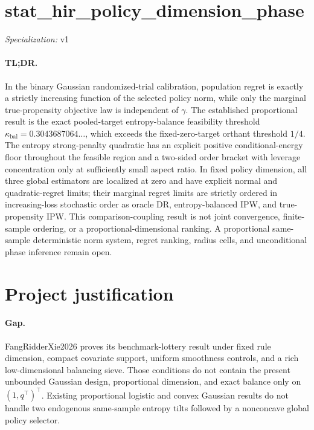 \documentclass{article}
\begin{document}
\sloppy

\section*{stat\_\allowbreak{}hir\_\allowbreak{}policy\_\allowbreak{}dimension\_\allowbreak{}phase}

\noindent\textit{Specialization:} v1\par

\paragraph{TL;DR.} In the binary Gaussian randomized-trial calibration, population regret is exactly a strictly increasing function of the selected policy norm, while only the marginal true-propensity objective law is independent of \(\gamma\). The established proportional result is the exact pooled-target entropy-balance feasibility threshold \(\kappa_{\mathrm{bal}}=0.3043687064\ldots\), which exceeds the fixed-zero-target orthant threshold \(1/4\). The entropy strong-penalty quadratic has an explicit positive conditional-energy floor throughout the feasible region and a two-sided order bracket with leverage concentration only at sufficiently small aspect ratio. In fixed policy dimension, all three global estimators are localized at zero and have explicit normal and quadratic-regret limits; their marginal regret limits are strictly ordered in increasing-loss stochastic order as oracle DR, entropy-balanced IPW, and true-propensity IPW. This comparison-coupling result is not joint convergence, finite-sample ordering, or a proportional-dimensional ranking. A proportional same-sample deterministic norm system, regret ranking, radius cells, and unconditional phase inference remain open.

\section{Project justification}

\paragraph{Gap.} FangRidderXie2026 proves its benchmark-lottery result under fixed rule dimension, compact covariate support, uniform smoothness controls, and a rich low-dimensional balancing sieve. Those conditions do not contain the present unbounded Gaussian design, proportional dimension, and exact balance only on \((1,q^\top)^\top\). Existing proportional logistic and convex Gaussian results do not handle two endogenous same-sample entropy tilts followed by a nonconcave global policy selector.
\end{document}
